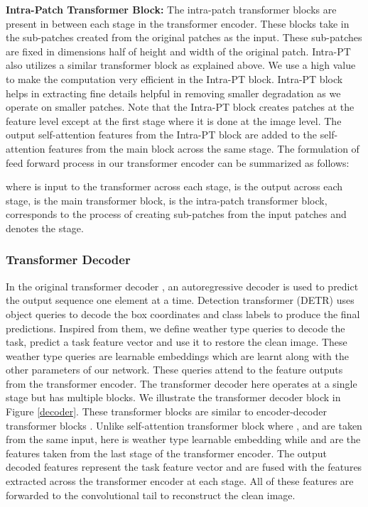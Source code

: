 \documentclass[10pt,twocolumn,letterpaper]{article}
\begin{document}
\noindent \textbf{Intra-Patch Transformer Block:} The intra-patch transformer blocks are present in between each stage in the transformer encoder. These blocks take in the sub-patches created from the original patches as the input. These sub-patches are fixed in dimensions half of height and width of the original patch. Intra-PT also utilizes a similar transformer block as explained above. We use a high  value to make the computation very efficient in the Intra-PT block. Intra-PT block helps in extracting fine details helpful in removing smaller degradation as we operate on smaller patches. Note that the Intra-PT block creates patches at the feature level except at the first stage where it is done at the image level. The output self-attention features from the Intra-PT block are added to the self-attention features from the main block across the same stage. The formulation of feed forward process in our transformer encoder can be summarized as follows:

where  is input to the transformer across each stage,  is the output across each stage,   is the main transformer block,  is the intra-patch transformer block,  corresponds to the process of creating sub-patches from the input patches and  denotes the stage. 
\vspace{-1em}
\subsubsection{Transformer Decoder}

In the original transformer decoder \cite{vaswani2017attention}, an autoregressive decoder is used to predict the output sequence one element at a time. Detection transformer (DETR) \cite{carion2020end} uses object queries to decode the box coordinates and class labels to produce the final predictions. Inspired from them, we define weather type queries to decode the task, predict a task feature vector and use it to restore the clean image. These weather type queries are learnable embeddings which are learnt along with the other parameters of our network. These queries attend to the feature outputs from the transformer encoder. The transformer decoder here operates at a single stage but has multiple blocks.  We illustrate the transformer decoder block in Figure \ref{decoder}. These transformer blocks are similar to  encoder-decoder transformer blocks \cite{vaswani2017attention}. Unlike self-attention transformer block where ,  and  are taken from the same input, here  is weather type learnable embedding  while  and  are the features taken from the last stage of the transformer encoder. The output decoded features represent the task feature vector and are fused with the features extracted across the transformer encoder at each stage. All of these features are forwarded to the convolutional tail to reconstruct the clean image.
\end{document}
